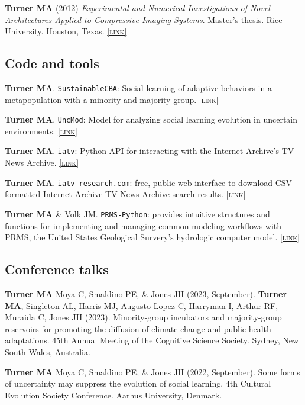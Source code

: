 \documentclass[11pt, letterpaper]{article}
\newcommand{\lurl}[1]{\href{#1}{\scriptsize\textsc{[link]}}}
\begin{document}
  \textbf{Turner MA} (2012) \emph{Experimental and Numerical
  Investigations of Novel Architectures Applied to Compressive
Imaging Systems}. Master's thesis. Rice University. Houston,
Texas. \lurl{https://www.researchgate.net/publication/274720620_Experimental_and_Numerical_In vestigations_of_Novel_Architectures_Applied_to_Compressive_Imaging_Systems}

\subsection{Code and tools}

\textbf{Turner MA}. \texttt{SustainableCBA}: Social learning of adaptive behaviors in a
metapopulation with a minority and majority group.
\lurl{https://github.com/eehh-stanford/SustainableCBA}

\textbf{Turner MA}. \texttt{UncMod}: Model for analyzing social learning evolution in uncertain
environments. \lurl{https://github.com/mt-digital/UncMod}

\textbf{Turner MA}. \texttt{iatv}: Python API for interacting with the Internet
Archive's TV News Archive. \lurl{https://github.com/mt-digital/iatv}

\textbf{Turner MA}. \texttt{iatv-research.com}: free, public web interface to download
CSV-formatted Internet Archive TV News Archive search results. \lurl{http://iatv-research.com}

\textbf{Turner MA} \& Volk JM. \texttt{PRMS-Python}: provides intuitive
structures and functions for implementing and managing common modeling
workflows with PRMS, the United States Geological Survery’s hydrologic computer
model. \lurl{https://prms-python.github.io/PRMS-Python/build/html/index.html}

\subsection{Conference talks}

    \textbf{Turner MA} Moya C, Smaldino PE, \& Jones JH (2023, September). \textbf{Turner MA}, Singleton AL, Harris MJ, Augusto Lopez C, Harryman I,
    Arthur RF, Muraida C, Jones JH (2023). Minority-group incubators and majority-group reservoirs for promoting the diffusion of climate change and public health adaptations. 45th Annual Meeting of the Cognitive Science Society.
    Sydney, New South Wales, Australia.

    \textbf{Turner MA} Moya C, Smaldino PE, \& Jones JH (2022, September). Some forms of
    uncertainty may suppress the evolution of social learning. 4th Cultural Evolution Society
    Conference. Aarhus University, Denmark. 
\end{document}
